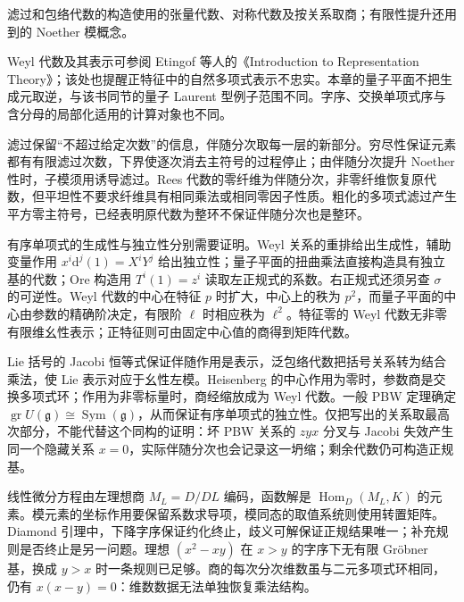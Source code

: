 \ProseParagraphBreak

滤过和包络代数的构造使用的张量代数、对称代数及按关系取商；有限性提升还用到的 Noether 模概念。

\ProseParagraphBreak
Weyl 代数及其表示可参阅 Etingof 等人的《Introduction to Representation Theory》\cite[\S 2.7, pp. 17--18]{EtingofEtAl2011RepresentationTheory}；该处也提醒正特征中的自然多项式表示不忠实。本章的量子平面不把生成元取逆，与该书同节的量子 Laurent 型例子范围不同。字序、交换单项式序与含分母的局部化适用的计算对象也不同。








\begin{chaptersummary}
	滤过保留“不超过给定次数”的信息，伴随分次取每一层的新部分。穷尽性保证元素都有有限滤过次数，下界使逐次消去主符号的过程停止；由伴随分次提升 Noether 性时，子模须用诱导滤过。Rees 代数的零纤维为伴随分次，非零纤维恢复原代数，但平坦性不要求纤维具有相同乘法或相同零因子性质。粗化的多项式滤过产生平方零主符号，已经表明原代数为整环不保证伴随分次也是整环。

	\ProseParagraphBreak
	有序单项式的生成性与独立性分别需要证明。Weyl 关系的重排给出生成性，辅助变量作用 \(x^i\mathrm d^j(1)=X^iY^j\) 给出独立性；量子平面的扭曲乘法直接构造具有独立基的代数；Ore 构造用 \(T^i(1)=z^i\) 读取左正规式的系数。右正规式还须另查 \(\sigma\) 的可逆性。Weyl 代数的中心在特征 \(p\) 时扩大，中心上的秩为 \(p^2\)，而量子平面的中心由参数的精确阶决定，有限阶 \(\ell\) 时相应秩为 \(\ell^2\)。特征零的 Weyl 代数无非零有限维幺性表示；正特征则可由固定中心值的商得到矩阵代数。

	\ProseParagraphBreak
	Lie 括号的 Jacobi 恒等式保证伴随作用是表示，泛包络代数把括号关系转为结合乘法，使 Lie 表示对应于幺性左模。Heisenberg 的中心作用为零时，参数商是交换多项式环；作用为非零标量时，商经缩放成为 Weyl 代数。一般 PBW 定理确定 \(\operatorname{gr}U(\mathfrak g)\cong\operatorname{Sym}(\mathfrak g)\)，从而保证有序单项式的独立性。仅把写出的关系取最高次部分，不能代替这个同构的证明：坏 PBW 关系的 \(zyx\) 分叉与 Jacobi 失效产生同一个隐藏关系 \(x=0\)，实际伴随分次也会记录这一坍缩；剩余代数仍可构造正规基。

	\ProseParagraphBreak
	线性微分方程由左理想商 \(M_L=D/DL\) 编码，函数解是 \(\operatorname{Hom}_D(M_L,K)\) 的元素。模元素的坐标作用要保留系数求导项，模同态的取值系统则使用转置矩阵。Diamond 引理中，下降字序保证约化终止，歧义可解保证正规结果唯一；补充规则是否终止是另一问题。理想 \((x^2-xy)\) 在 \(x>y\) 的字序下无有限 Gröbner 基，换成 \(y>x\) 时一条规则已足够。商的每次分次维数虽与二元多项式环相同，仍有 \(x(x-y)=0\)：维数数据无法单独恢复乘法结构。
\end{chaptersummary}


